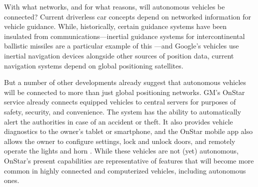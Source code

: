 
With what networks, and for what reasons, will autonomous vehicles be
connected? Current driverless car concepts depend on networked
information for vehicle guidance. While, historically, certain
guidance systems have been insulated from communications---inertial
guidance systems for intercontinental ballistic
missiles are a particular example of this \cite{mackenzie}---and
Google's vehicles use inertial navigation devices \cite{knightFurther}
alongside other sources of position data, current navigation systems
depend on global positioning satellites. %

But a number of other developments already suggest that autonomous
vehicles will be connected to more than just global positioning
networks. GM's OnStar service already connects equipped vehicles to central servers for
purposes of safety, security, and convenience. The system has the
ability to automatically alert the authorities in case of an accident
or theft. It also provides vehicle diagnostics to the owner's tablet
or smartphone, and the OnStar mobile app also allows the owner to
configure settings, lock and 
unlock doors, and remotely operate the lights and horn \cite{onstar}.
While these vehicles are not (yet) autonomous, OnStar's present
capabilities are representative of features that will become more common in highly
connected and computerized vehicles, including autonomous ones.



